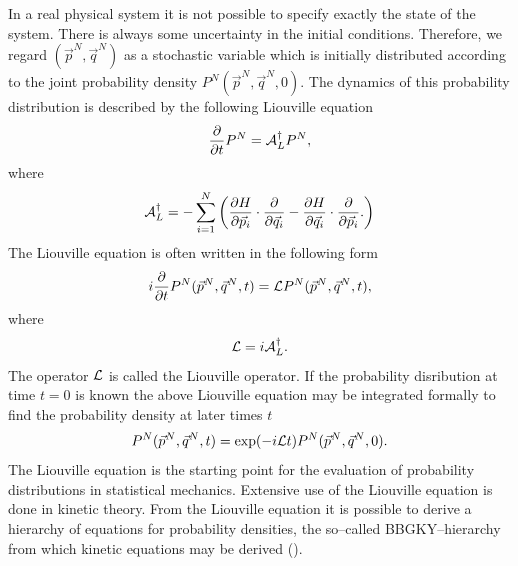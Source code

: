 In a real physical system it is not possible to specify exactly 
the state of the system. There is always some uncertainty in the 
initial conditions. Therefore, we regard $(\vec{p}^N,\vec{q}^N)$
as a stochastic variable which is initially distributed according 
to the joint probability density $P^N(\vec{p}^N,\vec{q}^N,0)$. 
The dynamics of this probability distribution
is described by the following 
Liouville equation
\begin{equation*}
\frac{\partial}{\partial t} P^N =  {\cal{A}}_L^{\dagger} P^N,
\end{equation*}
where
\begin{equation*}
{\cal{A}}_L^{\dagger} = -\sum_{i=1}^N \left( 
      \frac{\partial H}{\partial \vec{p}_i} 
            \cdot \frac{\partial}{\partial \vec{q}_i} 
         - \frac{\partial H}{\partial \vec{q}_i} 
             \cdot \frac{\partial}{\partial \vec{p}_i}.
      \right)
\end{equation*}
The Liouville equation is often written in the following form
\begin{equation*}
i \frac{\partial}{\partial t} P^N(\vec{p}^N,\vec{q}^N,t) =  
  {\cal{L}} P^N(\vec{p}^N,\vec{q}^N,t),
\end{equation*}
where
\begin{equation*}
{\cal{L}} =  i {\cal{A}}_L^{\dagger}.
\end{equation*}
The operator ${\cal{L}}$ is called the Liouville operator.
If the probability disribution at time $t=0$ is known the above 
Liouville equation may be integrated formally  
to find the probability density
at later times $t$
\begin{equation*}
P^N(\vec{p}^N,\vec{q}^N,t) = \exp(-i {\cal{L}}t)  
P^N(\vec{p}^N,\vec{q}^N,0).
\end{equation*}
The Liouville equation is the starting point for the evaluation of 
probability distributions in statistical mechanics. Extensive use 
of the Liouville equation is done in kinetic theory. From the 
Liouville equation it is possible to derive a hierarchy of 
equations for probability densities, the so--called 
BBGKY--hierarchy from which kinetic equations may be derived
(\cite{REICHL}).


